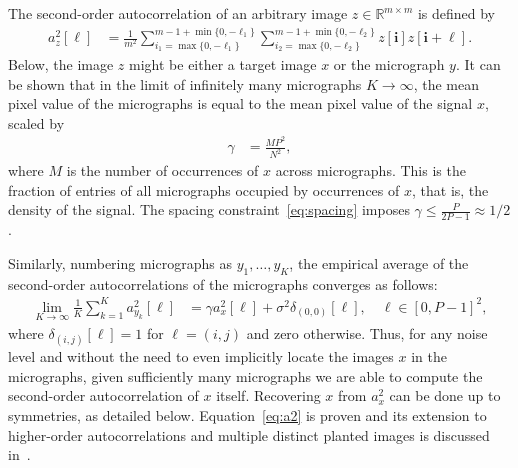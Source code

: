 \documentclass[english,11pt]{article}
\newcommand{\1}{\mathbf{1}}
\newcommand{\ii}{\textbf{i}}
\newcommand*\Bell{\ensuremath{\boldsymbol\ell}}
\numberwithin{equation}{section}
\theoremstyle{plain}
\theoremstyle{definition}
\theoremstyle{remark}
\theoremstyle{plain}
\theoremstyle{remark}
\theoremstyle{plain}
\theoremstyle{plain}
\begin{document}
The second-order autocorrelation of  an arbitrary image $z\in\mathbb{R}^{m\times m}$ is defined by
  \begin{align} 
 a_z^2[\Bell] & = \frac{1}{m^2} \sum_{i_1 = \max\{0, -\ell_1\}}^{m-1 + \min\{0, -\ell_1\}} \sum_{i_2 = \max\{0, -\ell_2\}}^{m-1 + \min\{0, -\ell_2\}}z[\ii]z[\ii+\Bell]. 
 \end{align}
 Below, the image $z$ might be either a target image $x$ or the micrograph $y$. 
 It can be shown that in the limit of infinitely many micrographs $K\to\infty$,  the mean pixel value of the micrographs is equal to the mean pixel value of the signal $x$, scaled by  
 \begin{align}
 \gamma & = \frac{M P^2}{N^2},
 \end{align}
 where $M$ is the number of occurrences of $x$ across micrographs. 
 This  is the fraction of entries of all micrographs occupied by occurrences of $x$, that is, the  density of the signal. 
  The spacing constraint~\eqref{eq:spacing} imposes $\gamma\leq\frac{P}{2P-1}\approx 1/2$.


 Similarly, numbering micrographs as $y_1, \ldots, y_K$, the empirical average of the second-order autocorrelations of the micrographs converges as follows:
 \begin{align} \label{eq:a2}
	\lim_{K \to \infty} \frac{1}{K} \sum_{k=1}^{K} a_{y_k}^2[\Bell] & = \gamma a_{x}^2[\Bell] + \sigma^2\delta_{(0,0)}[\Bell], \quad \Bell\in[0,P-1]^2,
 \end{align}
 where $\delta_{(i,j)}[\Bell]=1$ for $\Bell=(i,j)$ and zero otherwise.
 Thus, for any noise level and without the need to even implicitly locate the images $x$ in the micrographs, given sufficiently many micrographs we are able to compute the second-order autocorrelation of $x$ itself. Recovering $x$ from $a_x^2$ can be done up to symmetries, as detailed below.
 Equation~\eqref{eq:a2} is proven and its extension to higher-order autocorrelations and multiple distinct planted images is discussed in~\cite{bendory2018estimation}. 


\end{document}
